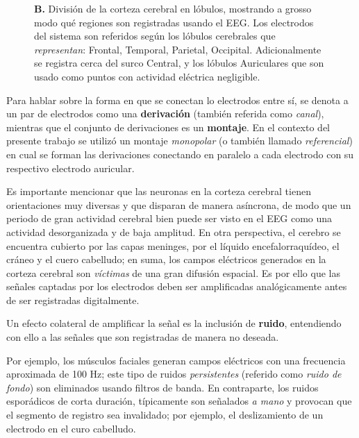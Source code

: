 \documentclass[12pt,letterpaper,draft]{book}
\newcommand{\hz}{\si{\hertz}\xspace}
\begin{document}
\begin{figure}
{%
\textbf{B.} División de la corteza cerebral en lóbulos, mostrando a grosso modo qué regiones son registradas usando el EEG. Los electrodos del sistema son referidos según los lóbulos cerebrales que \textit{representan}: Frontal, Temporal, Parietal, Occipital. Adicionalmente se registra cerca del surco Central, y los lóbulos Auriculares que son usado como puntos con actividad eléctrica negligible.
}
\label{img1020}
\end{figure}

Para hablar sobre la forma en que se conectan lo electrodos entre sí, se denota a un par de electrodos como una \textbf{derivación} (también referida como \textit{canal}), mientras que el conjunto de derivaciones es un \textbf{montaje}.
%
En el contexto del presente trabajo se utilizó un montaje \textit{monopolar} (o también llamado \textit{referencial}) en cual se forman las derivaciones conectando en paralelo a cada electrodo con su respectivo electrodo auricular.

Es importante mencionar que las neuronas en la corteza cerebral tienen orientaciones muy diversas y que disparan de manera asíncrona, de modo que un periodo de gran actividad cerebral bien puede ser visto en el EEG como una actividad desorganizada y de baja amplitud.
%
En otra perspectiva, el cerebro se encuentra cubierto por las capas meninges, por el líquido encefalorraquídeo, el cráneo y el cuero cabelludo; en suma, los campos eléctricos generados en la corteza cerebral son \textit{víctimas} de una gran difusión espacial.
%
Es por ello que las señales captadas por los electrodos deben ser amplificadas analógicamente antes de ser registradas digitalmente.

Un efecto colateral de amplificar la señal es la inclusión de \textbf{ruido}, entendiendo con ello a las señales que son registradas de manera no deseada.

Por ejemplo, los músculos faciales generan campos eléctricos con una frecuencia aproximada de 100 \hz; este tipo de ruidos \textit{persistentes} (referido como \textit{ruido de fondo}) son eliminados usando filtros de banda.
%
En contraparte, los ruidos esporádicos de corta duración, típicamente son señalados \textit{a mano} y provocan que el segmento de registro sea invalidado; por ejemplo, el deslizamiento de un electrodo en el curo cabelludo.
\end{document}
